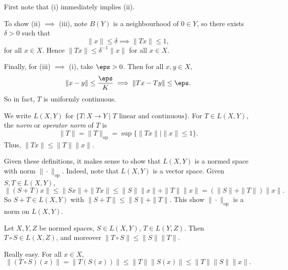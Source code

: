 \documentclass[12pt]{article}
\begin{document}
\begin{proofbox}
	First note that (i) immediately implies (ii).

	To show (ii) $\implies$ (iii), note $B(Y)$ is a neighbourhood of $0 \in Y$, so there exists $\delta > 0$ such that
	\[
	\|x\| \leq \delta \implies \|Tx\| \leq 1,
	\]
	for all $x \in X$. Hence $\|Tx\| \leq \delta^{-1} \|x\|$ for all $x \in X$.

	Finally, for (iii) $\implies$ (i), take $\eps > 0$. Then for all $x, y \in X$,
	\[
	\|x - y\| \leq \frac{\eps}{K} \implies \|Tx - Ty\| \leq \eps.
	\]
	So in fact, $T$ is uniformly continuous.
\end{proofbox}

We write $L(X, Y)$ for $\{T : X \to Y \mid T \text{ linear and continuous}\}$. For $T \in L(X, Y)$, the \emph{norm} or \emph{operator norm} of $T$ is
\[
	\|T\| = \|T\|_{\mathrm{op}} = \sup\{\|Tx\| \mid \|x\| \leq 1\}.
\]
Thus, $\|Tx\| \leq \|T\|\|x\|$.

Given these definitions, it makes sense to show that $L(X, Y)$ is a normed space with norm $\|\cdot\|_{\mathrm{op}}$. Indeed, note that $L(X, Y)$ is a vector space. Given $S, T \in L(X, Y)$,
\[
\|(S+T)x\| \leq \|Sx\| + \|Tx\| \leq \|S\|\|x\| + \|T\|\|x\| = (\|S\|+\|T\|)\|x\|.
\]
So $S + T \in L(X, Y)$ with $\|S+T\| \leq \|S\| + \|T\|$. This show $\|\cdot\|_{\mathrm{op}}$ is a norm on $L(X, Y)$.

\begin{proposition}
	Let $X, Y, Z$ be normed spaces, $S \in L(X, Y)$, $T \in L(Y, Z)$. Then $T \circ S \in L(X, Z)$, and moreover $\|T \circ S\| \leq \|S\|\|T\|$.
\end{proposition}

\begin{proofbox}
	Really easy. For all $x \in X$,
	\[
	\|(T \circ S) (x)\| = \|T(S(x))\| \leq \|T\|\|S(x)\| \leq \|T\|\|S\|\|x\|.
	\]
\end{proofbox}
\end{document}
